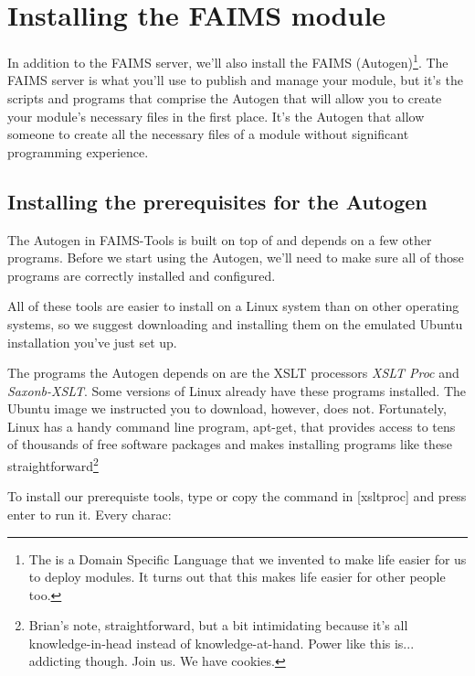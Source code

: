 
\section[installing-the-faims-tools]{Installing the FAIMS module }

In addition to the FAIMS server, we'll also install the FAIMS  (Autogen)\footnote{The  is a Domain Specific Language that we invented to make life easier for us to deploy modules. It turns out that this makes life easier for other people too.}. The FAIMS server is what you'll use to publish and manage your module, but it's the scripts and programs that comprise the Autogen that will allow you to create your module's necessary files in the first place. It's the Autogen that allow someone to create all the necessary files of a module without significant programming experience.

\subsection[installing-the-prerequisites-for-the-faims-tools]{Installing the prerequisites for the Autogen}

The Autogen in FAIMS-Tools is built on top of and depends on a few other programs. Before we start using the Autogen, we'll need to make sure all of those programs are correctly installed and configured.

All of these tools are easier to install on a Linux system than on other operating systems, so we suggest downloading and installing them on the emulated Ubuntu installation you've just set up.

The programs the Autogen depends on are the XSLT processors {\em XSLT Proc} and {\em Saxonb-XSLT}. Some versions of Linux already have these programs installed. The Ubuntu image we instructed you to download, however, does not. Fortunately, Linux has a handy command line program, apt-get, that provides access to tens of thousands of free software packages and makes installing programs like these straightforward\footnote{Brian's note, straightforward, but a bit intimidating because it's all knowledge-in-head instead of knowledge-at-hand. Power like this is... addicting though. Join us. We have cookies.}

To install our prerequiste tools, type or copy the command in [xsltproc] and press enter to run it. Every charac:


